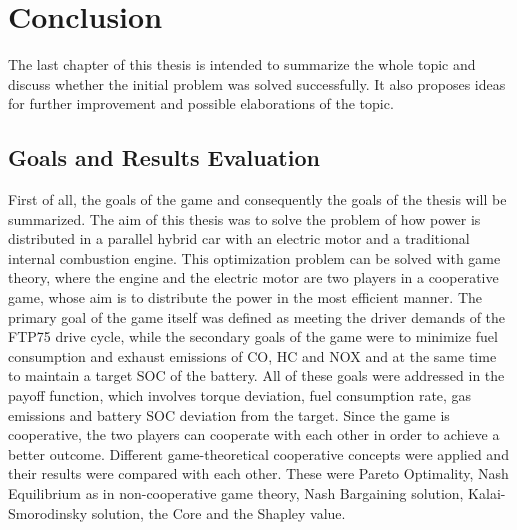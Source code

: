 \chapter{Conclusion}
\label{chp:conclusion}

The last chapter of this thesis is intended to summarize the whole topic and discuss whether the initial problem was solved successfully. It also proposes ideas for further improvement and possible elaborations of the topic.

\section{Goals and Results Evaluation}
First of all, the goals of the game and consequently the goals of the thesis will be summarized. The aim of this thesis was to solve the problem of how power is distributed in a parallel hybrid car with an electric motor and a traditional internal combustion engine. This optimization problem can be solved with game theory, where the engine and the electric motor are two players in a cooperative game, whose aim is to distribute the power in the most efficient manner. The primary goal of the game itself was defined as meeting the driver demands of the FTP75 drive cycle, while the secondary goals of the game were to minimize fuel consumption and exhaust emissions of CO, HC and NOX and at the same time to maintain a target SOC of the battery. All of these goals were addressed in the payoff function, which involves torque deviation, fuel consumption rate, gas emissions and battery SOC deviation from the target. Since the game is cooperative, the two players can cooperate with each other in order to achieve a better outcome. Different game-theoretical cooperative concepts were applied and their results were compared with each other. These were Pareto Optimality, Nash Equilibrium as in non-cooperative game theory, Nash Bargaining solution, Kalai-Smorodinsky solution, the Core and the Shapley value. 

